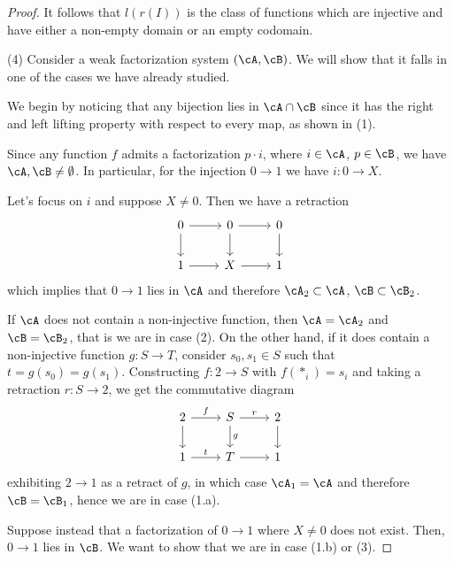\documentclass[a4paper,11pt,openany]{scrartcl}
\begin{document}
\begin{proof}
    It follows that $l(r(I))$ is the class of functions which are
    injective and have either a non-empty domain or an empty codomain.

    (4) Consider a weak factorization system $(\cA,\cB)$. We will show that it
    falls in one of the cases we have already studied.

    We begin by noticing that any bijection
    lies in $\cA\cap\cB$ since it has the right and left lifting property with
    respect to every map, as shown in (1).

    Since any function $f$ admits a factorization
    $p\cdot i$, where $i\in\cA$, $p\in\cB$, we have $\cA,\cB\neq\emptyset$. In
    particular, for the injection $0\rightarrow 1$ we have $i\colon 0\rightarrow
    X$.

    Let's focus on $i$ and suppose $X\neq 0$. Then we have a retraction
    \[\begin{tikzcd}
	{0} & {0} & {0} \\
	{1} & {X} & {1}
	\arrow[from=1-1, to=1-2]
	\arrow[from=1-2, to=1-3]
	\arrow[from=1-1, to=2-1]
	\arrow[from=1-2, to=2-2]
	\arrow[from=1-3, to=2-3]
	\arrow[from=2-2, to=2-3]
	\arrow[from=2-1, to=2-2]
    \end{tikzcd}\]
    which implies that $0\rightarrow 1$ lies in $\cA$ and therefore
    $\cA_2\subset\cA$, $\cB\subset\cB_2$.

    If $\cA$ does not contain a non-injective function, then $\cA=\cA_2$ and
    $\cB=\cB_2$, that is we are in case (2). On the other hand, if it does
    contain a non-injective function
    $g\colon S\rightarrow T$, consider $s_0,s_1\in S$ such that
    $t=g(s_0)=g(s_1)$. Constructing $f\colon 2\rightarrow S$ with $f(*_i)=s_i$
    and taking a retraction $r\colon S\rightarrow 2$, we get the commutative
    diagram
    \[\begin{tikzcd}
	{2} & {S} & {2} \\
	{1} & {T} & {1}
	\arrow["f", from=1-1, to=1-2]
	\arrow["r", from=1-2, to=1-3]
	\arrow[from=1-1, to=2-1]
	\arrow["g", from=1-2, to=2-2]
	\arrow[from=1-3, to=2-3]
	\arrow[from=2-2, to=2-3]
	\arrow["t", from=2-1, to=2-2]
    \end{tikzcd}\]
    exhibiting $2\rightarrow 1$ as a retract of $g$, in which case $\cA_1=\cA$
    and therefore $\cB=\cB_1$, hence we are in case (1.a).

    Suppose instead that a factorization of $0\rightarrow 1$ where $X\neq 0$
    does not exist. Then, $0\rightarrow 1$ lies in $\cB$. We want to show that
    we are in case (1.b) or (3).


\end{proof}
\end{document}
